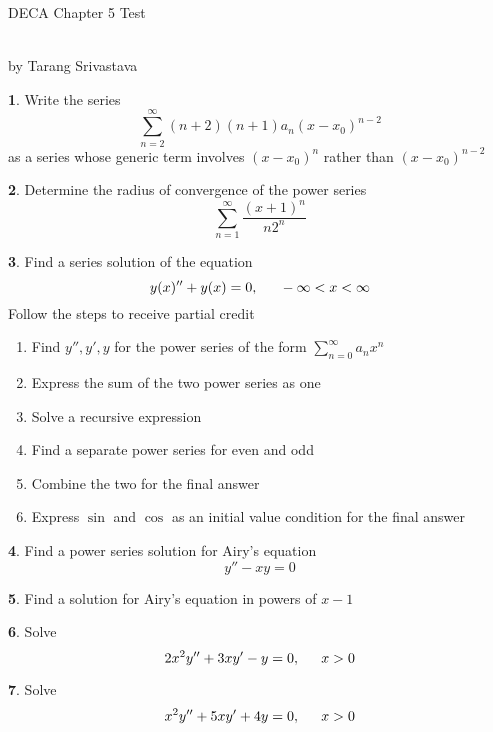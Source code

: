 \documentclass[11pt]{article}
\author{Tarang Srivastava}
\newcommand{\makechaptertitle}[1]{
\begin{center}
	\begin{large}
		DECA Chapter #1 Test
	\end{large}
	\begin{small}
		\\by Tarang Srivastava
	\end{small}
\end{center}
}
\theoremstyle{definition}
\newtheorem{q}{}
\begin{document}
	\begin{multicols*}{2}
		\makechaptertitle{5}	
		
		\begin{q}
			
			Write the series \[ \sum \limits_{n=2}^{\infty} (n+2)(n+1)a_n(x-x_0)^{n-2}  \] as a series whose generic term involves $ (x-x_0)^n $ rather than $ (x-x_0)^{n-2} $
			
		\end{q}
		\begin{q}
			Determine the radius of convergence of the power series \[ \sum \limits_{n=1}^\infty \dfrac{(x+1)^n}{n2^n} \]
		\end{q}
		\begin{q}
			Find a series solution of the equation \[ y(x)'' + y(x) = 0, \indent -\infty < x < \infty \] Follow the steps to receive partial credit
			\begin{enumerate}
				\item Find $ y'', y', y $ for the power series of the form $ \sum \limits_{n=0}^\infty a_nx^n$
				\item Express the sum of the two power series as one 
				\item Solve a recursive expression
				\item Find a separate power series for even and odd
				\item Combine the two for the final answer
				\item Express $ \sin $ and $ \cos $ as an initial value condition for the final answer
			\end{enumerate}
		\end{q}
		\begin{q}
			Find a power series solution for Airy's equation 
			\[ y'' - xy = 0 \]
		\end{q}
		\begin{q}
			Find a solution for Airy's equation in powers of $ x-1 $
		\end{q}
		\begin{q}
			Solve \[ 2x^2 y'' + 3xy' - y = 0, \indent x> 0 \]
		\end{q}
		\begin{q}
			Solve \[ x^2 y'' + 5xy' + 4y = 0, \indent x>0 \]
		\end{q}
	\end{multicols*}
\end{document}
